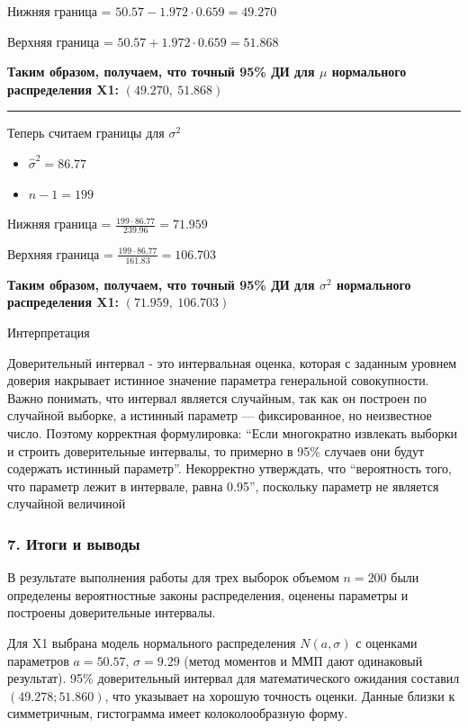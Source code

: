 \documentclass[11pt]{article}
\providecommand{\tightlist}{%
      \setlength{\itemsep}{0pt}\setlength{\parskip}{0pt}}
\begin{document}
Нижняя граница = \(50.57 - 1.972 \cdot 0.659 = 49.270\)

Верхняя граница = \(50.57 + 1.972 \cdot 0.659 = 51.868\)

\textbf{Таким образом, получаем, что точный 95\% ДИ для \(\mu\)
нормального распределения X1:} \((49.270, \ 51.868)\)

\begin{center}\rule{0.5\linewidth}{0.5pt}\end{center}

Теперь считаем границы для \(\sigma^2\)

\begin{itemize}
\tightlist
\item
  \(\hat{\sigma}^2 = 86.77\)
\item
  \(n - 1 = 199\)
\end{itemize}

Нижняя граница = \(\frac{199 \cdot 86.77}{239.96} = 71.959\)

Верхняя граница = \(\frac{199 \cdot 86.77}{161.83} = 106.703\)

\textbf{Таким образом, получаем, что точный 95\% ДИ для \(\sigma^2\)
нормального распределения X1:} \((71.959, \ 106.703)\)

    Интерпретация

Доверительный интервал - это интервальная оценка, которая с заданным
уровнем доверия накрывает истинное значение параметра генеральной
совокупности. Важно понимать, что интервал является случайным, так как
он построен по случайной выборке, а истинный параметр --- фиксированное,
но неизвестное число. Поэтому корректная формулировка: ``Если
многократно извлекать выборки и строить доверительные интервалы, то
примерно в 95\% случаев они будут содержать истинный параметр''.
Некорректно утверждать, что ``вероятность того, что параметр лежит в
интервале, равна 0.95'', поскольку параметр не является случайной
величиной

    \subsubsection{7. Итоги и
выводы}\label{ux438ux442ux43eux433ux438-ux438-ux432ux44bux432ux43eux434ux44b}

В результате выполнения работы для трех выборок объемом \(n = 200\) были
определены вероятностные законы распределения, оценены параметры и
построены доверительные интервалы.

Для X1 выбрана модель нормального распределения \(N(a, \sigma)\) с
оценками параметров \(a = 50.57\), \(\sigma = 9.29\) (метод моментов и
ММП дают одинаковый результат). 95\% доверительный интервал для
математического ожидания составил \((49.278; 51.860)\), что указывает на
хорошую точность оценки. Данные близки к симметричным, гистограмма имеет
колоколообразную форму.
\end{document}
